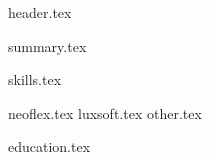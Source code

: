 \documentclass[11pt]{article}
\begin{document}
{header.tex}

{summary.tex}

{skills.tex}



{neoflex.tex}
{luxsoft.tex}
{other.tex}

{education.tex}



\end{document}
